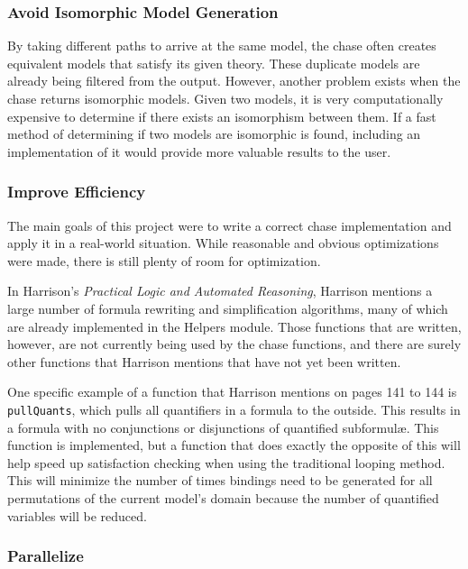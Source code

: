 		\subsubsection{Avoid Isomorphic Model Generation}

			By taking different paths to arrive at the same model, the chase
			often creates equivalent models that satisfy its given theory.
			These duplicate models are already being filtered from the output.
			However, another problem exists when the chase returns isomorphic
			models. Given two models, it is very computationally expensive to
			determine if there exists an isomorphism between them. If a fast
			method of determining if two models are isomorphic is found,
			including an implementation of it would provide more valuable
			results to the user.

		\subsubsection{Improve Efficiency}

			The main goals of this project were to write a correct chase
			implementation and apply it in a real-world situation. While
			reasonable and obvious optimizations were made, there is still
			plenty of room for optimization.

			In \cite{Harrison09} Harrison's \emph{Practical Logic and Automated
			Reasoning}, Harrison mentions a large number of formula rewriting
			and simplification algorithms, many of which are already
			implemented in the Helpers module. Those functions that are
			written, however, are not currently being used by the chase
			functions, and there are surely other functions that Harrison
			mentions that have not yet been written.

			One specific example of a function that \cite{Harrison09} Harrison
			mentions on pages 141 to 144 is {\tt pullQuants}, which pulls all
			quantifiers in a formula to the outside. This results in a formula
			with no conjunctions or disjunctions of quantified subformul{\ae}.
			This function is implemented, but a function that does exactly the
			opposite of this will help speed up satisfaction checking when
			using the traditional looping method. This will minimize the number
			of times bindings need to be generated for all permutations of the
			current model's domain because the number of quantified variables
			will be reduced.

		\subsubsection{Parallelize}


